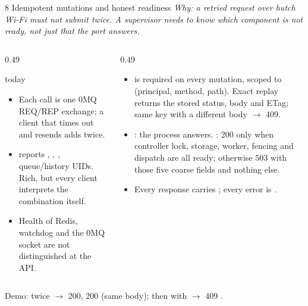 \begin{frame}{8 \quad Idempotent mutations and honest readiness}
    {\footnotesize\itshape Why: a retried request over hutch Wi-Fi must not submit twice. A supervisor needs to know
    which component is not ready, not just that the port answers.}
    \vspace{0.05cm}
    \begin{columns}[T]
        \begin{column}{0.49\textwidth}
            \begin{alertblock}{\legacy{} today}
                \footnotesize
                \begin{itemize}
                    \item Each call is one 0MQ REQ/REP exchange; a client that times out and resends
                           adds twice.
                    \item {} reports , ,
                          , queue/history UIDs. 
                          Rich, but every client interprets the combination itself.
                    \item Health of Redis, watchdog and the 0MQ socket are not distinguished at the API.
                \end{itemize}
            \end{alertblock}
        \end{column}
        \begin{column}{0.49\textwidth}
            \begin{block}{\vtwo{}}
                \footnotesize
                \begin{itemize}
                    \item {} is required on every mutation, scoped to
                          (principal, method, path). Exact replay returns the stored status, body and ETag;
                          same key with a different body $\rightarrow$ 409. 
                    \item {}: the process answers. : 200 only when controller lock,
                          storage, worker, fencing and dispatch are all ready; otherwise 503 with those five
                          coarse fields and nothing else.
                    \item Every response carries ; every error is
                          .
                \end{itemize}
            \end{block}
        \end{column}
    \end{columns}
    \vspace{0.1cm}
    {\footnotesize\color{qsgray} Demo:  twice $\rightarrow$ 200, 200 (same body);
    then with  $\rightarrow$ 409 .\par}
\end{frame}
